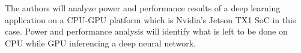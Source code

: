 The authors will analyze power and performance results of a deep learning application on a CPU-GPU platform which is Nvidia's Jetson TX1 SoC in this case. Power and performance analysis will identify what is left to be done on CPU while GPU inferencing a deep neural network. 